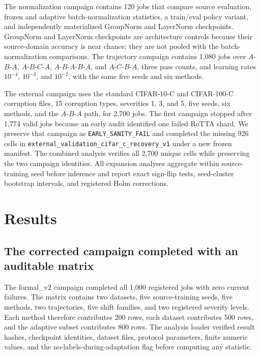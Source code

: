 \documentclass[11pt]{article}
\begin{document}
The normalization campaign contains 120 jobs that compare source evaluation, frozen and adaptive batch-normalization statistics, a train/eval policy variant, and independently materialized GroupNorm and LayerNorm checkpoints. GroupNorm and LayerNorm checkpoints are architecture controls because their source-domain accuracy is near chance; they are not pooled with the batch-normalization comparisons. The trajectory campaign contains 1,080 jobs over $A$-$B$-$A$, $A$-$B$-$C$-$A$, $A$-$B$-$A$-$B$-$A$, and $A$-$C$-$B$-$A$, three pass counts, and learning rates $10^{-4}$, $10^{-3}$, and $10^{-2}$, with the same five seeds and six methods.

The external campaign uses the standard CIFAR-10-C and CIFAR-100-C corruption files, 15 corruption types, severities 1, 3, and 5, five seeds, six methods, and the $A$-$B$-$A$ path, for 2,700 jobs. The first campaign stopped after 1,774 valid jobs because an early audit identified one failed RoTTA shard. We preserve that campaign as \texttt{EARLY\_SANITY\_FAIL} and completed the missing 926 cells in \texttt{external\_validation\_cifar\_c\_recovery\_v1} under a new frozen manifest. The combined analysis verifies all 2,700 unique cells while preserving the two campaign identities. All expansion analyses aggregate within source-training seed before inference and report exact sign-flip tests, seed-cluster bootstrap intervals, and registered Holm corrections.

\section{Results}
\label{sec:results}

\subsection{The corrected campaign completed with an auditable matrix}
\label{sec:campaign-result}

The formal\_v2 campaign completed all 1,000 registered jobs with zero current failures. The matrix contains two datasets, five source-training seeds, five methods, two trajectories, five shift families, and two registered severity levels. Each method therefore contributes 200 rows, each dataset contributes 500 rows, and the adaptive subset contributes 800 rows. The analysis loader verified result hashes, checkpoint identities, dataset files, protocol parameters, finite numeric values, and the no-labels-during-adaptation flag before computing any statistic.
\end{document}
